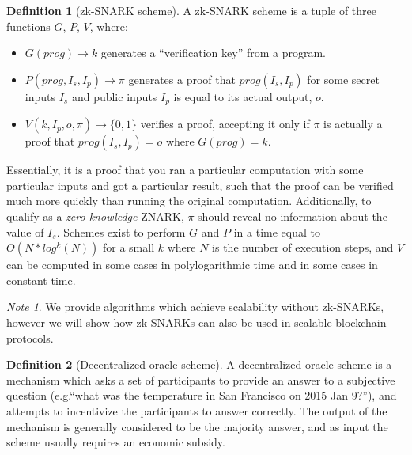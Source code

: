 \documentclass[11pt,a4paper]{article}
\makeatletter
\theoremstyle{plain}
\theoremstyle{definition}
\newtheorem{defn}{Definition}[section]
\theoremstyle{remark}
\newtheorem*{note}{Note}
\newcommand{\eg}{e.g.\@\xspace}
\makeatother
\begin{document}
\begin{defn}[zk-SNARK scheme]
A zk-SNARK scheme is a tuple of three functions $G$, $P$, $V$, where:
\begin{itemize}
\item
$G(prog) \rightarrow k$ generates a ``verification key'' from a program.
\item
$P(prog, I_s, I_p) \rightarrow \pi$ generates a proof that $prog(I_s, I_p)$ for some secret inputs $I_s$ and public inputs $I_p$ is equal to its actual output, $o$.
\item
$V(k, I_p, o, \pi) \rightarrow \{0, 1\}$ verifies a proof, accepting it only if $\pi$ is actually a proof that $prog(I_s, I_p) = o$ where $G(prog) = k$.
\end{itemize}
Essentially, it is a proof that you ran a particular computation with some particular inputs and got a particular result, such that the proof can be verified much more quickly than running the original computation. Additionally, to qualify as a \emph{zero-knowledge} ZNARK, $\pi$ should reveal no information about the value of $I_s$. Schemes exist \cite{snark} to perform $G$ and $P$ in a time equal to $O(N*log^k(N))$ for a small $k$ where $N$ is the number of execution steps, and $V$ can be computed in some cases in polylogarithmic time and in some cases in constant time.
\end{defn}

\begin{note}
We provide algorithms which achieve scalability without zk-SNARKs, however we will show how zk-SNARKs can also be used in scalable blockchain protocols.
\end{note}

\begin{defn}[Decentralized oracle scheme]
A decentralized oracle scheme is a mechanism which asks a set of participants to provide an answer to a subjective question (\eg ``what was the temperature in San Francisco on 2015 Jan 9?''), and attempts to incentivize the participants to answer correctly. The output of the mechanism is generally considered to be the majority answer, and as input the scheme usually requires an economic subsidy.
\end{defn}
\end{document}
